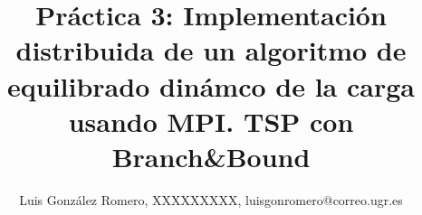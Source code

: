 \author{Luis González Romero, XXXXXXXXX, luisgonromero@correo.ugr.es}
\title{Práctica 3: Implementación distribuida de un algoritmo de equilibrado dinámco de la carga usando MPI. TSP con Branch\&Bound}
\newcommand{\grupopracticas}{Grupo 1: Miércoles 09:30-11:30}
\newcommand{\subtitulo}{Subtítulo}
\newcommand{\curso}{Programación Paralela}
\newcommand{\departamento}{Lenguajes y Sistemas Informáticos}